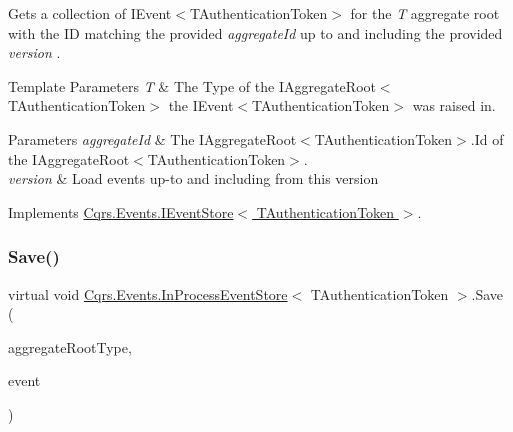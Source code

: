 Gets a collection of I\+Event$<$\+T\+Authentication\+Token$>$ for the {\itshape T} aggregate root with the ID matching the provided {\itshape aggregate\+Id}  up to and including the provided {\itshape version} . 


\begin{DoxyTemplParams}{Template Parameters}
{\em T} & The Type of the I\+Aggregate\+Root$<$\+T\+Authentication\+Token$>$ the I\+Event$<$\+T\+Authentication\+Token$>$ was raised in.\\
\hline
\end{DoxyTemplParams}

\begin{DoxyParams}{Parameters}
{\em aggregate\+Id} & The I\+Aggregate\+Root$<$\+T\+Authentication\+Token$>$.\+Id of the I\+Aggregate\+Root$<$\+T\+Authentication\+Token$>$.\\
\hline
{\em version} & Load events up-\/to and including from this version\\
\hline
\end{DoxyParams}


Implements \hyperlink{interfaceCqrs_1_1Events_1_1IEventStore_af29401f4562cb504cf827b90b8391765_af29401f4562cb504cf827b90b8391765}{Cqrs.\+Events.\+I\+Event\+Store$<$ T\+Authentication\+Token $>$}.

\mbox{\label{classCqrs_1_1Events_1_1InProcessEventStore_ad9ddcf747084d8173bd703a6dd1b5041_ad9ddcf747084d8173bd703a6dd1b5041}} 
\subsubsection{\texorpdfstring{Save()}{Save()}}
{\footnotesize\ttfamily virtual void \hyperlink{classCqrs_1_1Events_1_1InProcessEventStore}{Cqrs.\+Events.\+In\+Process\+Event\+Store}$<$ T\+Authentication\+Token $>$.Save (\begin{DoxyParamCaption}\item[{Type}]{aggregate\+Root\+Type,  }\item[{\hyperlink{interfaceCqrs_1_1Events_1_1IEvent}{I\+Event}$<$ T\+Authentication\+Token $>$ @}]{event }\end{DoxyParamCaption})\hspace{0.3cm}{\ttfamily [virtual]}}



